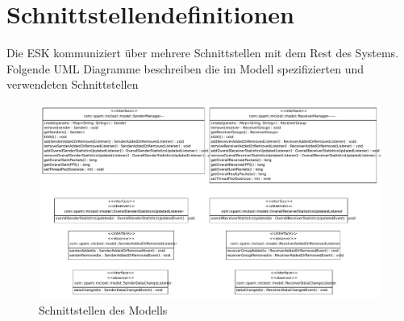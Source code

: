 \chapter{Schnittstellendefinitionen}
Die ESK kommuniziert über mehrere Schnittstellen mit dem Rest des Systems.
Folgende UML Diagramme beschreiben die im Modell spezifizierten und verwendeten
Schnittstellen

\begin{figure}[H]
\center
\includegraphics[width=22cm,angle=90]{images/interfaces.pdf}
\caption{Schnittstellen des Modells}
\end{figure}
